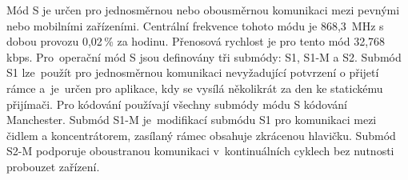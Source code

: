 \begin{table}[!ht]
\centering
\caption{Režimy přenosu WM-Bus protokolu~\cite{WmbusTables}}
\label{TableRezimy}
\end{table}

Mód S je určen pro jednosměrnou nebo obousměrnou komunikaci mezi pevnými nebo mobilními zařízeními. Centrální frekvence tohoto módu je 868,3\, MHz s dobou provozu 0,02\,\% za hodinu. Přenosová rychlost je pro tento mód 32,768\,kbps. Pro~operační mód S jsou definovány tři submódy: S1, S1-M a S2. Submód S1 lze~použít pro jednosměrnou komunikaci nevyžadující potvrzení o přijetí rámce a~je~určen pro aplikace, kdy se vysílá několikrát za den ke statickému přijímači. Pro kódování používají všechny submódy módu S kódování Manchester.  
Submód S1-M je~modifikací submódu S1 pro komunikaci mezi čidlem a koncentrátorem, zasílaný rámec obsahuje zkrácenou hlavičku.
Submód S2-M podporuje oboustranou komunikaci v~kontinuálních cyklech bez nutnosti probouzet zařízení.

